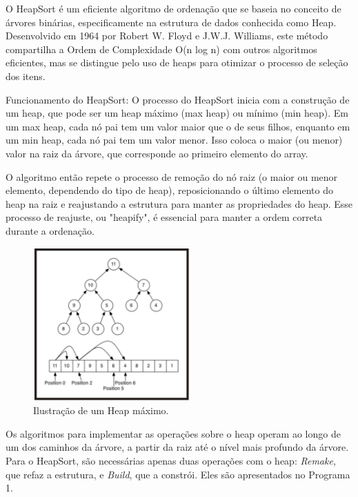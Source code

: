 O HeapSort é um eficiente algoritmo de ordenação que se baseia no conceito de árvores binárias, especificamente na estrutura de dados conhecida como Heap. Desenvolvido em 1964 por Robert W. Floyd e J.W.J. Williams, este método compartilha a Ordem de Complexidade O(n log n) com outros algoritmos eficientes, mas se distingue pelo uso de heaps para otimizar o processo de seleção dos itens.\cite{mello2002ordenacao}

Funcionamento do HeapSort:
O processo do HeapSort inicia com a construção de um heap, que pode ser um heap máximo (max heap) ou mínimo (min heap). Em um max heap, cada nó pai tem um valor maior que o de seus filhos, enquanto em um min heap, cada nó pai tem um valor menor. Isso coloca o maior (ou menor) valor na raiz da árvore, que corresponde ao primeiro elemento do array.\cite{lopes2005heap}

O algoritmo então repete o processo de remoção do nó raiz (o maior ou menor elemento, dependendo do tipo de heap), reposicionando o último elemento do heap na raiz e reajustando a estrutura para manter as propriedades do heap. Esse processo de reajuste, ou "heapify", é essencial para manter a ordem correta durante a ordenação.

 \begin{figure}[H]
    \centering
    \includegraphics[width = 6cm]{Imagens/Heap Sort/image.png}
    \caption{Ilustração de um Heap máximo\cite{lopes2005heap}. }
    \label{imagem_heap}
\end{figure}

Os algoritmos para implementar as operações sobre o heap operam ao longo de um dos caminhos da árvore, a partir da raiz até o nível mais profundo da árvore. Para o HeapSort, são necessárias apenas duas operações com o heap: \textit{Remake}, que refaz a estrutura, e \textit{Build}, que a constrói. Eles são apresentados no Programa 1.

